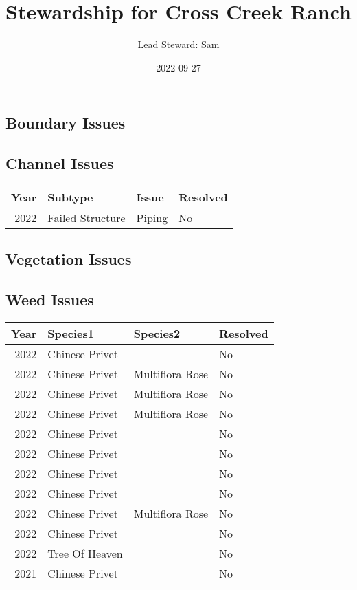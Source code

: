 \documentclass[
  landscape]{article}
\title{Stewardship for Cross Creek Ranch}
\author{Lead Steward: Sam}
\date{2022-09-27}
\begin{document}
\maketitle

\hypertarget{boundary-issues}{%
\subsection{Boundary Issues}\label{boundary-issues}}

\textbar\textbar{} \textbar\textbar{} \textbar\textbar{}
\textbar\textbar{}

\hypertarget{channel-issues}{%
\subsection{Channel Issues}\label{channel-issues}}

\begin{longtable}[]{@{}rlll@{}}
\toprule()
Year & Subtype & Issue & Resolved \\
\midrule()
\endhead
2022 & Failed Structure & Piping & No \\
\bottomrule()
\end{longtable}

\newpage

\hypertarget{vegetation-issues}{%
\subsection{Vegetation Issues}\label{vegetation-issues}}

\textbar\textbar{} \textbar\textbar{} \textbar\textbar{}
\textbar\textbar{}

\newpage

\hypertarget{weed-issues}{%
\subsection{Weed Issues}\label{weed-issues}}

\begin{longtable}[]{@{}rlll@{}}
\toprule()
Year & Species1 & Species2 & Resolved \\
\midrule()
\endhead
2022 & Chinese Privet & & No \\
2022 & Chinese Privet & Multiflora Rose & No \\
2022 & Chinese Privet & Multiflora Rose & No \\
2022 & Chinese Privet & Multiflora Rose & No \\
2022 & Chinese Privet & & No \\
2022 & Chinese Privet & & No \\
2022 & Chinese Privet & & No \\
2022 & Chinese Privet & & No \\
2022 & Chinese Privet & Multiflora Rose & No \\
2022 & Chinese Privet & & No \\
2022 & Tree Of Heaven & & No \\
2021 & Chinese Privet & & No \\
\bottomrule()
\end{longtable}
\end{document}

